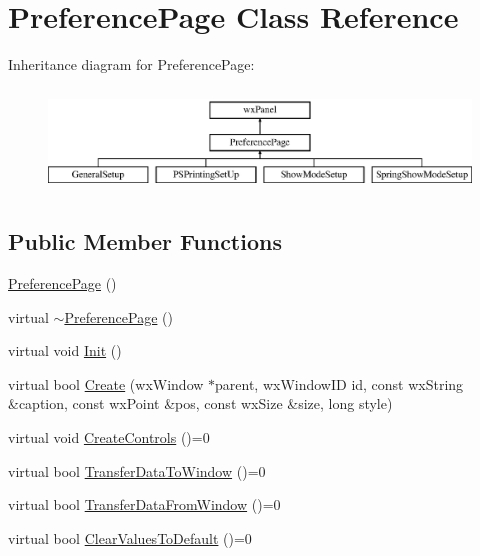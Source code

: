 \hypertarget{a00116}{\section{Preference\-Page Class Reference}
\label{a00116}
}
Inheritance diagram for Preference\-Page\-:\begin{figure}[H]
\begin{center}
\leavevmode
\includegraphics[height=2.763158cm]{a00116}
\end{center}
\end{figure}
\subsection*{Public Member Functions}
\begin{DoxyCompactItemize}
\item 
\hyperlink{a00116_a60f1c46faa1deb5df5951e5e948e0500}{Preference\-Page} ()
\item 
virtual \hyperlink{a00116_af357a78319a9b7fa553315c7f48aad1a}{$\sim$\-Preference\-Page} ()
\item 
virtual void \hyperlink{a00116_a1129e8c32770a740fb1982871290bb6f}{Init} ()
\item 
virtual bool \hyperlink{a00116_a3e50f7b08e92ef53f1a20756928c299e}{Create} (wx\-Window $\ast$parent, wx\-Window\-I\-D id, const wx\-String \&caption, const wx\-Point \&pos, const wx\-Size \&size, long style)
\item 
virtual void \hyperlink{a00116_ac3b9e5375479ac799b2883dbc2d234c6}{Create\-Controls} ()=0
\item 
virtual bool \hyperlink{a00116_ac21d8c929b71724f8198a2c45233d59c}{Transfer\-Data\-To\-Window} ()=0
\item 
virtual bool \hyperlink{a00116_a53cb2271d3320da2c69f0a7ebe7f1cc6}{Transfer\-Data\-From\-Window} ()=0
\item 
virtual bool \hyperlink{a00116_abb2ea7795a6463fe773a09f90587c897}{Clear\-Values\-To\-Default} ()=0
\end{DoxyCompactItemize}


